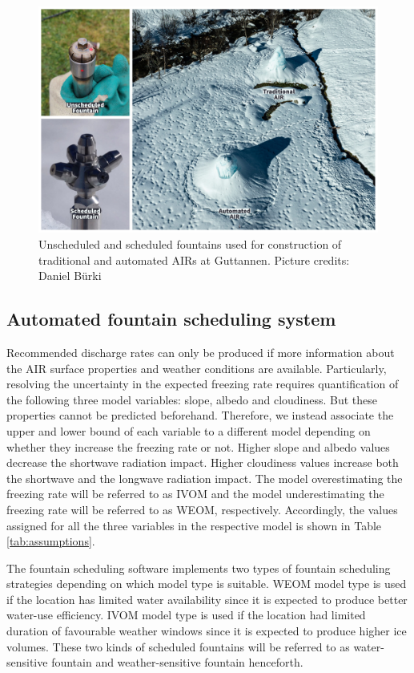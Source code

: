 \begin{figure}[htb]
\includegraphics[width=\textwidth]{figs/AIR_fountains.jpg}
\caption{Unscheduled and scheduled fountains used for construction of traditional and automated AIRs at Guttannen. Picture credits: Daniel Bürki}
\label{fig:autovsman}
\end{figure}

\subsection{Automated fountain scheduling system}


Recommended discharge rates can only be produced if more information about the AIR surface properties and
weather conditions are available. Particularly, resolving the uncertainty in the expected freezing rate requires
quantification of the following three model variables: slope, albedo and cloudiness. But these properties cannot
be predicted beforehand. Therefore, we instead associate the upper and lower bound of each variable to a
different model depending on whether they increase the freezing rate or not. Higher slope and albedo values
decrease the shortwave radiation impact. Higher cloudiness values increase both the shortwave and the longwave
radiation impact. The model overestimating the freezing rate will be referred to as \ac{IVOM} and the model
underestimating the freezing rate will be referred to as  \ac{WEOM}, respectively. Accordingly, the values
assigned for all the three variables in the respective model is shown in Table \ref{tab:assumptions}.

The fountain scheduling software implements two types of fountain scheduling strategies depending on which
model type is suitable. WEOM model type is used if the location has limited water availability since it is expected to
produce better water-use efficiency. \ac{IVOM} model type is used if the location had limited duration of favourable
weather windows since it is expected to produce higher ice volumes. These two kinds of scheduled fountains will
be referred to as water-sensitive fountain and weather-sensitive fountain henceforth.

